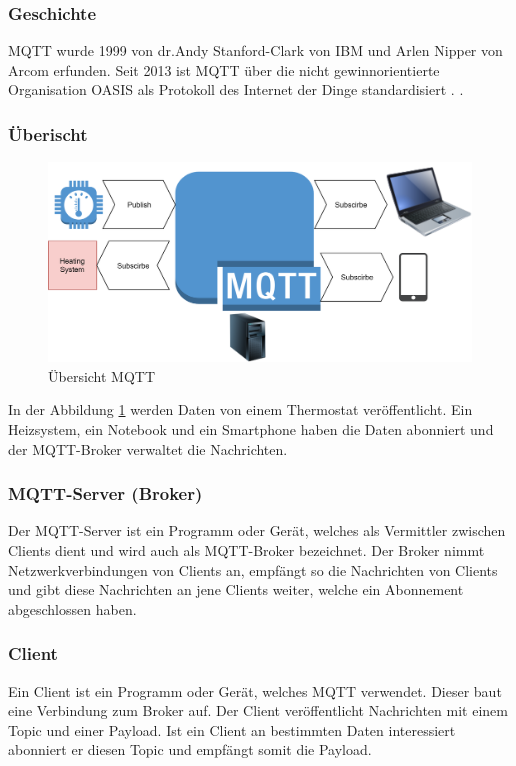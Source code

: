 \subsubsection{Geschichte}
MQTT wurde 1999 von dr.Andy Stanford-Clark von IBM und Arlen Nipper von Arcom erfunden. Seit 2013 ist MQTT über die nicht gewinnorientierte Organisation OASIS als Protokoll des Internet der Dinge standardisiert \cite{noauthor_mqtt-v5.0.pdf_nodate}. .
\subsubsection{Überischt}
 \begin{figure}[H]
 	\centering
 	\includegraphics[width=\textwidth]{graphics/OverviewMQTT.PNG}
 	\caption{Übersicht MQTT} 	
 	\label{pic: OverMQTT}
 \end{figure} 
In der Abbildung \ref{pic: OverMQTT} werden Daten von einem Thermostat veröffentlicht. Ein Heizsystem, ein Notebook und ein Smartphone haben die Daten abonniert und der MQTT-Broker verwaltet die Nachrichten. 

\subsubsection{MQTT-Server (Broker)}
Der MQTT-Server ist ein Programm oder Gerät, welches als Vermittler zwischen Clients dient und wird auch als MQTT-Broker bezeichnet. Der Broker nimmt Netzwerkverbindungen von Clients an, empfängt so die Nachrichten von Clients und gibt diese Nachrichten an jene Clients weiter, welche ein Abonnement abgeschlossen haben.

\subsubsection{Client}
Ein Client ist ein Programm oder Gerät, welches MQTT verwendet. Dieser baut eine Verbindung zum Broker auf. Der Client veröffentlicht Nachrichten mit einem Topic und einer Payload. Ist ein Client an bestimmten Daten interessiert abonniert er diesen Topic und empfängt somit die Payload.
 
